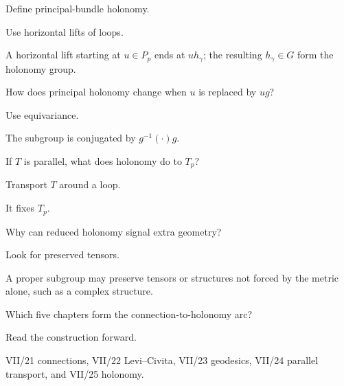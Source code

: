 \begin{exercise}\label{exr:vii25-19}
Define principal-bundle holonomy.
\end{exercise}
\begin{hint}
Use horizontal lifts of loops.
\end{hint}
\begin{solution}
A horizontal lift starting at \(u\in P_p\) ends at \(u h_\gamma\); the resulting \(h_\gamma\in G\) form the holonomy group.
\end{solution}


\begin{exercise}\label{exr:vii25-20}
How does principal holonomy change when \(u\) is replaced by \(ug\)?
\end{exercise}
\begin{hint}
Use equivariance.
\end{hint}
\begin{solution}
The subgroup is conjugated by \(g^{-1}(\cdot)g\).
\end{solution}


\begin{exercise}\label{exr:vii25-21}
If \(T\) is parallel, what does holonomy do to \(T_p\)?
\end{exercise}
\begin{hint}
Transport \(T\) around a loop.
\end{hint}
\begin{solution}
It fixes \(T_p\).
\end{solution}


\begin{exercise}\label{exr:vii25-22}
Why can reduced holonomy signal extra geometry?
\end{exercise}
\begin{hint}
Look for preserved tensors.
\end{hint}
\begin{solution}
A proper subgroup may preserve tensors or structures not forced by the metric alone, such as a complex structure.
\end{solution}


\begin{exercise}\label{exr:vii25-23}
Which five chapters form the connection-to-holonomy arc?
\end{exercise}
\begin{hint}
Read the construction forward.
\end{hint}
\begin{solution}
VII/21 connections, VII/22 Levi--Civita, VII/23 geodesics, VII/24 parallel transport, and VII/25 holonomy.
\end{solution}



